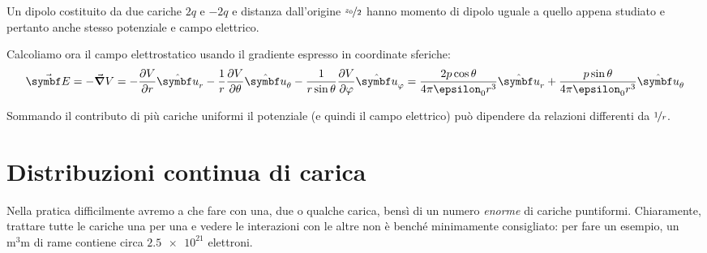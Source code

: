 \begin{example}
	Un dipolo costituito da due cariche $2q$ e $-2q$ e distanza dall'origine $\nicefrac{z_0}{2}$ hanno momento di dipolo uguale a quello appena studiato e pertanto anche stesso potenziale e campo elettrico.
\end{example}
Calcoliamo ora il campo elettrostatico usando il gradiente espresso in coordinate sferiche:
\begin{equation}
	\vba{E}=-\grad{V}=-\pdv{V}{r}\vbh{u}_r-\frac{1}{r}\pdv{V}{\theta}\vbh{u}_\theta-\frac{1}{r\sin\theta}\pdv{V}{\phi}\vbh{u}_\phi=\frac{2p\cos\theta}{4\pi\epsilon_0r^3}\vbh{u}_r+\frac{p\sin\theta}{4\pi\epsilon_0r^3}\vbh{u}_\theta
\end{equation}
\begin{observe}
	Sommando il contributo di più cariche uniformi il potenziale (e quindi il campo elettrico) può dipendere da relazioni differenti da $\nicefrac{1}{r}$.
\end{observe}
\section{Distribuzioni continua di carica}
Nella pratica difficilmente avremo a che fare con una, due o qualche carica, bensì di un numero \textit{enorme} di cariche puntiformi. Chiaramente, trattare tutte le cariche una per una e vedere le interazioni con le altre non è benché minimamente consigliato: per fare un esempio, un $\unit{\cubic\milli\metre}$ di rame contiene circa $\num[exponent-product = \ensuremath{\cdot}]{2,5e21}$ elettroni.

